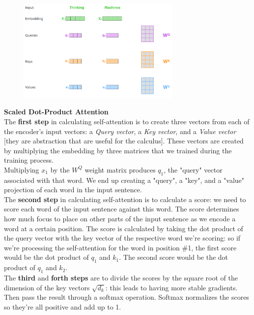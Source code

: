 \begin{figure}
    \includegraphics[width=8cm]{images/transformer_self_attention_vectors.png}
\end{figure}

\textbf{Scaled Dot-Product Attention}\\
The \textbf{first step} in calculating self-attention is to create three vectors from each of the encoder’s input vectors: a \textit{Query vector}, a \textit{Key vector}, and a \textit{Value vector} [they are abstraction that are useful for the calculus]. These vectors are created by multiplying the embedding by three matrices that we trained during the training process. \\
Multiplying $x_1$ by the $W^Q$ weight matrix produces $q_1$, the "query" vector associated with that word. We end up creating a "query", a "key", and a "value" projection of each word in the input sentence. \\

The \textbf{second step} in calculating self-attention is to calculate a score: we need to score each word of the input sentence against this word. The score determines how much focus to place on other parts of the input sentence as we encode a word at a certain position. The score is calculated by taking the dot product of the query vector with the key vector of the respective word we’re scoring: so if we’re processing the self-attention for the word in position \#1, the first score would be the dot product of $q_1$ and $k_1$. The second score would be the dot product of $q_1$ and $k_2$. \\

The \textbf{third} and \textbf{forth steps} are to divide the scores by the square root of the dimension of the key vectors $\sqrt{d_k}$: this leads to having more stable gradients.\\
Then pass the result through a softmax operation. Softmax normalizes the scores so they’re all positive and add up to 1. \\

